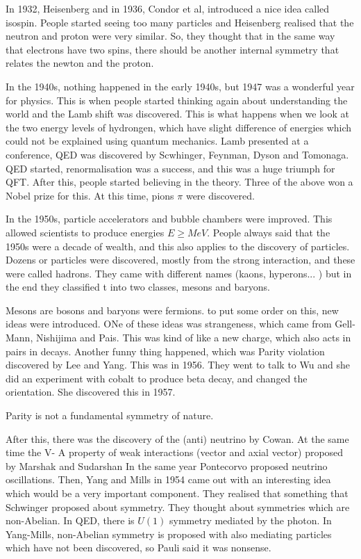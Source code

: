 \documentclass[11pt, oneside]{article}   	%
\theoremstyle{slanted}
\begin{document}
In 1932, Heisenberg 
and in 1936, Condor et al, introduced a nice idea called isospin. 
People started seeing too many particles and Heisenberg realised 
that the neutron and proton were very similar. 
So, they thought that in the same way that electrons have two spins, 
there should be another internal symmetry that relates the newton and 
the proton. 

In the 1940s, 
nothing happened in the early 1940s, but 1947  
was a wonderful year for physics. This is when people 
started thinking again about understanding the world 
and the Lamb shift was discovered. 
This is what happens when we look at the two energy levels of hydrongen, 
which have slight difference of energies which could not be explained 
using quantum mechanics. 
Lamb presented at a conference, QED was discovered by 
Scwhinger, Feynman, Dyson and Tomonaga. 
QED started, renormalisation was a success, and this 
was a huge triumph for QFT. After this, 
people started believing in the theory. 
Three of the above won a Nobel prize for this. 
At this time, pions $ \pi $ were discovered. 

In the 1950s, 
particle accelerators 
and bubble chambers were improved. 
This allowed scientists 
to produce energies $ E \ge  Me V $. 
People always said that the 1950s were a decade of wealth, 
and this also applies to the discovery of 
particles. Dozens or particles were discovered, 
mostly from the strong interaction, 
and these were called hadrons.
They came with different names (kaons, hyperons... )
but in the end they classified t into two classes, 
mesons and baryons. 

Mesons are bosons and baryons were fermions. 
to put some order on this, 
new ideas were introduced. 
ONe of these ideas was strangeness, which 
came from Gell-Mann, Nishijima and Pais. 
This was kind of like a new charge, 
which also acts in pairs in decays. 
Another funny thing happened, 
which was Parity violation discovered by Lee and Yang. 
This was in 1956. They went to talk to Wu 
and she did an experiment with cobalt to produce 
beta decay, and changed the orientation. 
She discovered this in 1957. 

Parity is not a fundamental symmetry of nature. 

After this, there was the discovery of 
the (anti) neutrino by Cowan. 
At the same time the V- A property 
of weak interactions (vector and axial vector)
proposed by Marshak and Sudarshan 
In the same year 
Pontecorvo proposed neutrino oscillations. 
Then, 
Yang and Mills in 1954 came out with an 
interesting idea which would be a very important component. 
They realised that something that Schwinger proposed about 
symmetry. They thought about 
symmetries which are non-Abelian. 
In QED, there is $ U ( 1 ) $ symmetry mediated by the 
photon. 
In Yang-Mills, non-Abelian symmetry is proposed with 
also mediating particles which have not been discovered, so Pauli said it was nonsense. 
\end{document}
